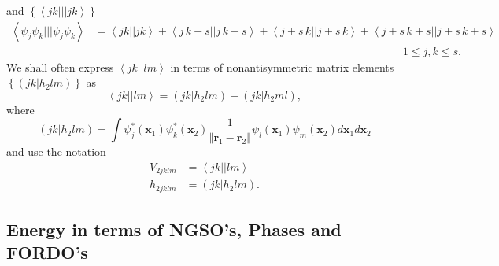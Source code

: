 \documentclass[aps,preprint]{revtex4}%
\begin{document}
and $\left\{  \left\langle jk|||jk\right\rangle \right\}  $
\begin{align}
\left\langle \psi_{j}\psi_{k}|||\psi_{j}\psi_{k}\right\rangle  &
=\left\langle jk||jk\right\rangle +\left\langle j\,k+s||j\,k+s\right\rangle
+\left\langle j+s\,k||j+s\,k\right\rangle +\left\langle
j+s\,k+s||j+s\,k+s\right\rangle \nonumber\\
&  \left.  {}\right.  \qquad\qquad\qquad\qquad\qquad\qquad\qquad\qquad
\qquad\qquad\qquad\qquad\qquad\qquad1\leq j,k\leq s.
\end{align}
We shall often express $\left\langle jk||lm\right\rangle $ in terms of
nonantisymmetric matrix elements $\left\{  \left(  \left.  jk\right\vert
h_{2}lm\right)  \right\}  $ as
\begin{equation}
\left\langle jk||lm\right\rangle =\left(  \left.  jk\right\vert h_{2}%
lm\right)  -\left(  \left.  jk\right\vert h_{2}ml\right)  ,
\end{equation}
where
\begin{equation}
\left(  \left.  jk\right\vert h_{2}lm\right)  =\int\psi_{j}^{\ast}\left(
\bm{x}_{1}\right)  \psi_{k}^{\ast}\left(  \bm{x}_{2}\right)  \frac
{1}{\left\Vert \bm{r}_{1}-\bm{r}_{2}\right\Vert }\psi_{l}\left(
\bm{x}_{1}\right)  \psi_{m}\left(  \bm{x}_{2}\right)  d\bm{x}_{1}d\bm{x}_{2}%
\end{equation}
and use the notation
\begin{align}
V_{2jklm}  &  =\left\langle jk||lm\right\rangle \nonumber\\
h_{2jklm}  &  =\left(  \left.  jk\right\vert h_{2}lm\right)  .
\end{align}


\subsection{Energy in terms of NGSO's, Phases and FORDO's\label{EnON_NGSO}}
\end{document}
